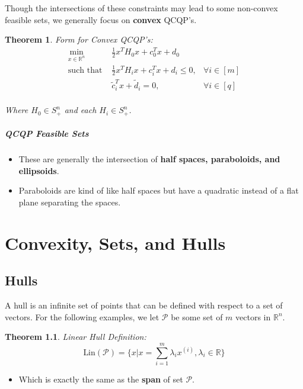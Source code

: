 \documentclass[a4paper,12pt]{report}
\newtheorem{theorem}{Theorem}
\begin{document}
Though the intersections of these constraints may lead to some non-convex feasible sets, we generally focus on \textbf{convex} QCQP's. 

\begin{theorem}{Form for Convex QCQP's: }
\begin{align}
\min_{x\in \mathbb{R}^n} & \frac{1}{2} x^T H_0 x + c_0^T x + d_0 \\
\text{such that }& \frac{1}{2} x^T H_i x + c_i^T x + d_i \leq 0, & \forall i\in [m] \\
& \tilde c_i^T x + \tilde d_i = 0, & \forall i\in [q] \\
\end{align}

Where $H_0\in S_+^n$ and each $H_i \in S_+^n$.
\end{theorem}

\paragraph{QCQP Feasible Sets} 
\begin{itemize}
\item These are generally the intersection of \textbf{half spaces, paraboloids, and ellipsoids}.
\item Paraboloids are kind of like half spaces but have a quadratic instead of a flat plane separating the spaces. 
\end{itemize}


\chapter{Convexity, Sets, and Hulls}

\section{Hulls}

A hull is an infinite set of points that can be defined with respect to a set of vectors. For the following examples, we let $\mathcal{P}$ be some set of $m$ vectors in $\mathbb{R}^n$. 

\begin{theorem}{Linear Hull Definition: }
\begin{equation}
\text{Lin}(\mathcal{P}) = \{x | x = \sum_{i = 1}^{m} \lambda_i x^{(i)}, \lambda_i \in \mathbb{R}\}
\end{equation}
\end{theorem}
\begin{itemize}
\item Which is exactly the same as the \textbf{span} of set $\mathcal P$.
\end{itemize}
\end{document}
